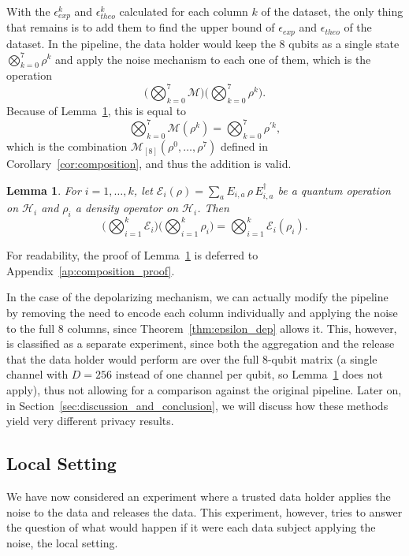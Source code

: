 \documentclass{ieeeaccess}
\newtheorem{lemma}{Lemma}[section]
\begin{document}
With the $\epsilon_{exp}^{k}$ and $\epsilon_{theo}^{k}$ calculated for each column $k$ of the dataset, the only thing that remains is to add them to find the upper bound of $\epsilon_{exp}$ and $\epsilon_{theo}$ of the dataset. In the pipeline, the data holder would keep the 8 qubits as a single state $\bigotimes_{k=0}^{7} \rho^{k}$ and apply the noise mechanism to each one of them, which is the operation
\[
  \Big(\bigotimes_{k=0}^{7} \mathcal{M}\Big)\Big(\bigotimes_{k=0}^{7} \rho^{k}\Big).
\]
Because of Lemma~\ref{lem:product_channel}, this is equal to
\[
  \bigotimes_{k=0}^{7} \mathcal{M}(\rho^{k}) = \bigotimes_{k=0}^{7} \rho^{\prime k},
\]
which is the combination $\mathcal{M}_{[8]}(\rho^{0}, \dots, \rho^{7})$ defined in Corollary~\ref{cor:composition}, and thus the addition is valid.


\begin{lemma}
  For $i = 1, \dots, k$, let $\mathcal{E}_i(\rho) = \sum_{a} E_{i,a}\, \rho\, E_{i,a}^{\dagger}$ be a quantum operation on $\mathcal{H}_i$ and $\rho_i$ a density operator on $\mathcal{H}_i$. Then
  \[
    \Big(\bigotimes_{i=1}^{k} \mathcal{E}_i\Big)\Big(\bigotimes_{i=1}^{k} \rho_i\Big) = \bigotimes_{i=1}^{k} \mathcal{E}_i(\rho_i).
  \]
  \label{lem:product_channel}
\end{lemma}

For readability, the proof of Lemma~\ref{lem:product_channel} is deferred to Appendix~\ref{ap:composition_proof}.

In the case of the depolarizing mechanism, we can actually modify the pipeline by removing the need to encode each column individually and applying the noise to the full 8 columns, since Theorem~\ref{thm:epsilon_dep} allows it. This, however, is classified as a separate experiment, since both the aggregation and the release that the data holder would perform are over the full 8-qubit matrix (a single channel with $D = 256$ instead of one channel per qubit, so Lemma~\ref{lem:product_channel} does not apply), thus not allowing for a comparison against the original pipeline. Later on, in Section~\ref{sec:discussion_and_conclusion}, we will discuss how these methods yield very different privacy results.


\subsection{Local Setting}
\label{subsec:experiment_local_setting}

We have now considered an experiment where a trusted data holder applies the noise to the data and releases the data. This experiment, however, tries to answer the question of what would happen if it were each data subject applying the noise, the local setting.
\end{document}
